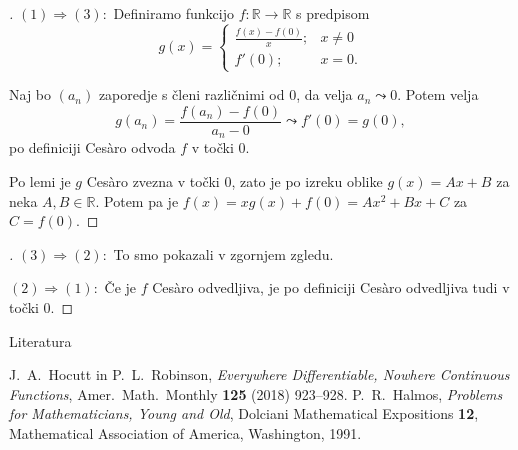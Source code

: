 \documentclass[10pt,hyperref={unicode}]{beamer}
\newenvironment{dokaz}{\begin{proof}[\bfseries\upshape\proofname]}{\end{proof}}
\begin{document}
\begin{frame}
    \begin{dokaz}\renewcommand{\qedsymbol}{}
        $(1) \Rightarrow (3): $ Definiramo funkcijo $f: \mathbb{R} \rightarrow \mathbb{R}$ s predpisom 
        $$
        g(x) = \begin{cases}
            \frac{f(x)-f(0)}{x}; & x \neq 0\\
            f'(0); & x = 0.
        \end{cases}
        $$
        \pause

        Naj bo $(a_n)$ zaporedje s členi različnimi od $0$, da velja $a_n \leadsto 0$. Potem velja 
        $$g(a_n) = \frac{f(a_n)-f(0)}{a_n-0} \leadsto f'(0) = g(0),$$
        po definiciji Ces\`{a}ro odvoda $f$ v točki $0$. 
        \pause
        
        Po lemi je $g$ Ces\`{a}ro zvezna v točki $0$, zato je po izreku oblike $g(x) = Ax + B$ za neka $A, B \in \mathbb{R}$. Potem pa je 
        $f(x) = xg(x) + f(0) = Ax^2 + Bx + C$ za $C = f(0)$.
    \end{dokaz}
\end{frame}

\begin{frame}
    \begin{dokaz}
        $(3) \Rightarrow (2): $ To smo pokazali v zgornjem zgledu.
        \pause

        \medskip
        $(2) \Rightarrow (1): $ Če je $f$ Ces\`{a}ro odvedljiva, je po definiciji Ces\`{a}ro odvedljiva tudi v točki $0$.
    \end{dokaz}
\end{frame}

\begin{frame}{Literatura}
    \begin{thebibliography}{1}
        J.~A.~Hocutt in P.~L.~Robinson, \emph{Everywhere Differentiable, Nowhere Continuous Functions}, Amer.~Math.~Monthly \textbf{125} (2018) 923--928.
        P.~R.~Halmos, \emph{Problems for Mathematicians, Young and Old}, Dolciani Mathematical Expositions \textbf{12}, Mathematical Association of America, Washington, 1991.
    \end{thebibliography}
\end{frame}
\end{document}
